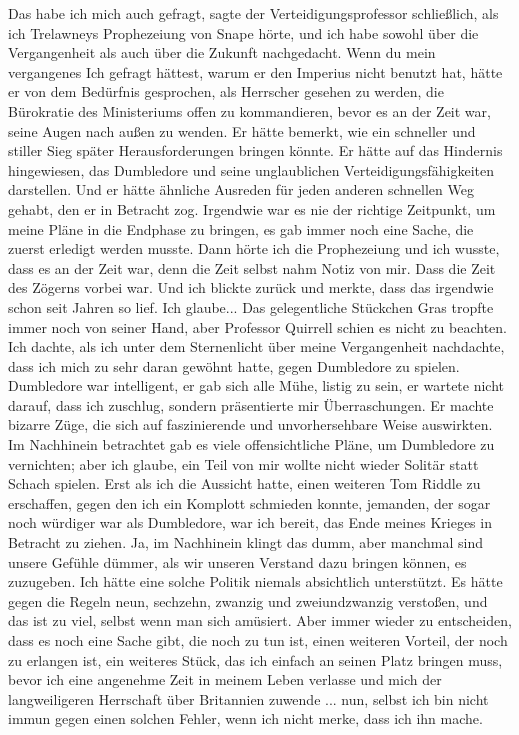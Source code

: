\glqq{}Das habe ich mich auch gefragt\grqq{}, sagte der Verteidigungsprofessor
schließlich, \glqq{}als ich Trelawneys Prophezeiung von Snape hörte, und ich habe
sowohl über die Vergangenheit als auch über die Zukunft nachgedacht. Wenn du
mein vergangenes Ich gefragt hättest, warum er den Imperius nicht benutzt hat,
hätte er von dem Bedürfnis gesprochen, als Herrscher gesehen zu werden, die
Bürokratie des Ministeriums offen zu kommandieren, bevor es an der Zeit war,
seine Augen nach außen zu wenden. Er hätte bemerkt, wie ein schneller und
stiller Sieg später Herausforderungen bringen könnte. Er hätte auf das Hindernis
hingewiesen, das Dumbledore und seine unglaublichen Verteidigungsfähigkeiten
darstellen. Und er hätte ähnliche Ausreden für jeden anderen schnellen Weg
gehabt, den er in Betracht zog. Irgendwie war es nie der richtige Zeitpunkt, um
meine Pläne in die Endphase zu bringen, es gab immer noch eine Sache, die zuerst
erledigt werden musste. Dann hörte ich die Prophezeiung und ich wusste, dass es
an der Zeit war, denn die Zeit selbst nahm Notiz von mir. Dass die Zeit des
Zögerns vorbei war. Und ich blickte zurück und merkte, dass das irgendwie schon
seit Jahren so lief. Ich glaube...\grqq{} Das gelegentliche Stückchen Gras tropfte
immer noch von seiner Hand, aber Professor Quirrell schien es nicht zu beachten.
\glqq{}Ich dachte, als ich unter dem Sternenlicht über meine Vergangenheit
nachdachte, dass ich mich zu sehr daran gewöhnt hatte, gegen Dumbledore zu
spielen. Dumbledore war intelligent, er gab sich alle Mühe, listig zu sein, er
wartete nicht darauf, dass ich zuschlug, sondern präsentierte mir
Überraschungen. Er machte bizarre Züge, die sich auf faszinierende und
unvorhersehbare Weise auswirkten. Im Nachhinein betrachtet gab es viele
offensichtliche Pläne, um Dumbledore zu vernichten; aber ich glaube, ein Teil
von mir wollte nicht wieder Solitär statt Schach spielen. Erst als ich die
Aussicht hatte, einen weiteren Tom Riddle zu erschaffen, gegen den ich ein
Komplott schmieden konnte, jemanden, der sogar noch würdiger war als Dumbledore,
war ich bereit, das Ende meines Krieges in Betracht zu ziehen. Ja, im Nachhinein
klingt das dumm, aber manchmal sind unsere Gefühle dümmer, als wir unseren
Verstand dazu bringen können, es zuzugeben. Ich hätte eine solche Politik
niemals absichtlich unterstützt. Es hätte gegen die Regeln neun, sechzehn,
zwanzig und zweiundzwanzig verstoßen, und das ist zu viel, selbst wenn man sich
amüsiert. Aber immer wieder zu entscheiden, dass es noch eine Sache gibt, die
noch zu tun ist, einen weiteren Vorteil, der noch zu erlangen ist, ein weiteres
Stück, das ich einfach an seinen Platz bringen muss, bevor ich eine angenehme
Zeit in meinem Leben verlasse und mich der langweiligeren Herrschaft über
Britannien zuwende ... nun, selbst ich bin nicht immun gegen einen solchen
Fehler, wenn ich nicht merke, dass ich ihn mache.\grqq{}

